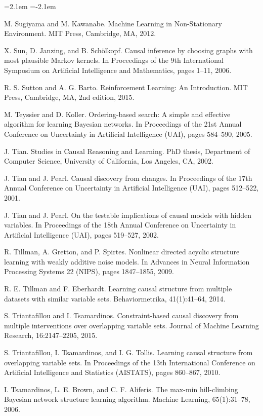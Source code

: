 \begin{list}{}{\leftmargin=2.1em
 \itemindent=-2.1em\parsep=0pt\itemsep=3pt}
\item M. Sugiyama and M. Kawanabe. Machine Learning in Non-Stationary Environment. MIT Press, Cambridge, MA, 2012.
\item X. Sun, D. Janzing, and B. Schölkopf. Causal inference by choosing graphs with most plausible Markov kernels. In Proceedings of the 9th International Symposium on Artificial Intelligence and Mathematics, pages 1--11, 2006.
\item R. S. Sutton and A. G. Barto. Reinforcement Learning: An Introduction. MIT Press, Cambridge, MA, 2nd edition, 2015.
\item M. Teyssier and D. Koller. Ordering-based search: A simple and effective algorithm for learning Bayesian networks. In Proceedings of the 21st Annual Conference on Uncertainty in Artificial Intelligence (UAI), pages 584--590, 2005.
\item J. Tian. Studies in Causal Reasoning and Learning. PhD thesis, Department of Computer Science, University of California, Los Angeles, CA, 2002.
\item J. Tian and J. Pearl. Causal discovery from changes. In Proceedings of the 17th Annual Conference on Uncertainty in Artificial Intelligence (UAI), pages 512--522, 2001.
\item J. Tian and J. Pearl. On the testable implications of causal models with hidden variables. In Proceedings of the 18th Annual Conference on Uncertainty in Artificial Intelligence (UAI), pages 519--527, 2002.
\item R. Tillman, A. Gretton, and P. Spirtes. Nonlinear directed acyclic structure learning with weakly additive noise models. In Advances in Neural Information Processing Systems 22 (NIPS), pages 1847--1855, 2009.
\item R. E. Tillman and F. Eberhardt. Learning causal structure from multiple datasets with similar variable sets. Behaviormetrika, 41(1):41--64, 2014.
\item S. Triantafillou and I. Tsamardinos. Constraint-based causal discovery from multiple interventions over overlapping variable sets. Journal of Machine Learning Research, 16:2147--2205, 2015.
\item S. Triantafillou, I. Tsamardinos, and I. G. Tollis. Learning causal structure from overlapping variable sets. In Proceedings of the 13th International Conference on Artificial Intelligence and Statistics (AISTATS), pages 860--867, 2010.
\item I. Tsamardinos, L. E. Brown, and C. F. Aliferis. The max-min hill-climbing Bayesian network structure learning algorithm. Machine Learning, 65(1):31--78, 2006.

\end{list}
